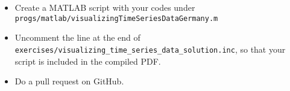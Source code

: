 \begin{enumerate}
\begin{itemize}
    \item Create a MATLAB script with your codes under \texttt{progs/matlab/visualizingTimeSeriesDataGermany.m}
    \item Uncomment the line at the end of \texttt{exercises/visualizing\_time\_series\_data\_solution.inc},
    so that your script is included in the compiled PDF.    
    \item Do a pull request on GitHub.
\end{itemize}
%
\end{enumerate}